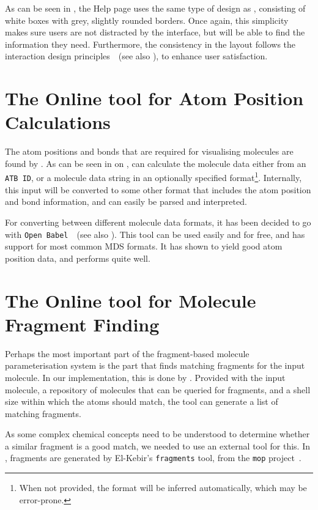 As can be seen in , the Help page uses the same type of design as \oframp, consisting of white boxes with grey, slightly rounded borders. Once again, this simplicity makes sure users are not distracted by the interface, but will be able to find the information they need. Furthermore, the consistency in the layout follows the interaction design principles~\cite{norman2010gestural,blair2008user}~(see also ), to enhance user satisfaction.



\section[\oapoc]{The Online tool for Atom Position Calculations}
The atom positions and bonds that are required for visualising molecules are found by \oapoc. As can be seen in  on , \oapoc{} can calculate the molecule data either from an \verb|ATB ID|, or a molecule data string in an optionally specified format\footnote{When not provided, the format will be inferred automatically, which may be error-prone.}. Internally, this input will be converted to some other format that includes the atom position and bond information, and can easily be parsed and interpreted.

For converting between different molecule data formats, it has been decided to go with \verb|Open Babel|~\cite{oboyle2011open}~(see also ). This tool can be used easily and for free, and has support for most common MDS formats. It has shown to yield good atom position data, and performs quite well.



\section[\omfraf]{The Online tool for Molecule Fragment Finding}
Perhaps the most important part of the fragment-based molecule parameterisation system is the part that finds matching fragments for the input molecule. In our implementation, this is done by \omfraf. Provided with the input molecule, a repository of molecules that can be queried for fragments, and a shell size within which the atoms should match, the tool can generate a list of matching fragments.

As some complex chemical concepts need to be understood to determine whether a similar fragment is a good match, we needed to use an external tool for this. In \omfraf, fragments are generated by El-Kebir's \verb|fragments| tool, from the \verb|mop| project~\cite{elkebir2014molecule}.

